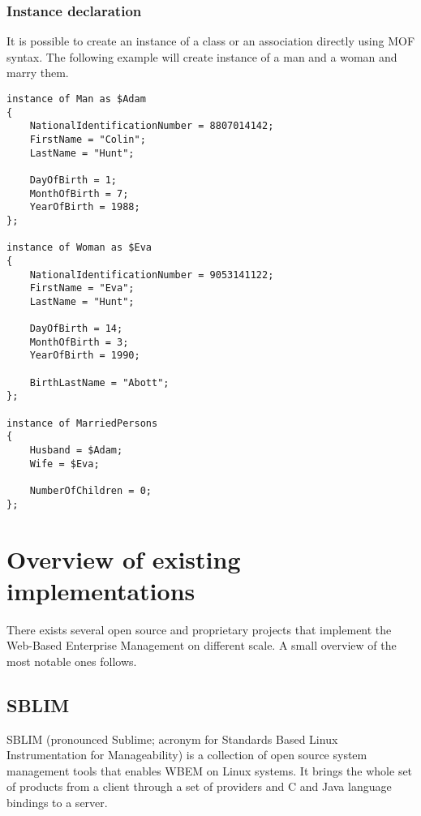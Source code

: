 \subsubsection{Instance declaration}
\label{wbem:cim:mof:instance}

It is possible to create an instance of a class or an association directly using
MOF syntax. The following example will create instance of a man and a woman and
marry them.

\begin{lstlisting}[caption={MOF example: instantiation},
label=lst:wbem:mof:instantiation,
morekeywords={instance, of, as}]
instance of Man as $Adam
{
    NationalIdentificationNumber = 8807014142;
    FirstName = "Colin";
    LastName = "Hunt";

    DayOfBirth = 1;
    MonthOfBirth = 7;
    YearOfBirth = 1988;
};

instance of Woman as $Eva
{
    NationalIdentificationNumber = 9053141122;
    FirstName = "Eva";
    LastName = "Hunt";

    DayOfBirth = 14;
    MonthOfBirth = 3;
    YearOfBirth = 1990;
    
    BirthLastName = "Abott";
};

instance of MarriedPersons
{
    Husband = $Adam;
    Wife = $Eva;
    
    NumberOfChildren = 0;
};
\end{lstlisting}

\section{Overview of existing implementations}
\label{wbem:implementations}

There exists several open source and proprietary projects that implement the
Web-Based Enterprise Management on different scale. A small overview of the most
notable ones follows.

\subsection{SBLIM}
\label{wbem:implementations:sblim}

SBLIM (pronounced Sublime; acronym for Standards Based Linux Instrumentation for
Manageability) is a collection of open source system management tools that
enables WBEM on Linux systems. It brings the whole set of products from a client
through a set of providers and C and Java language bindings to a server.

